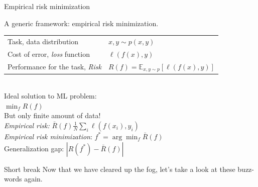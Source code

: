 \documentclass[10pt,a4paper,t,aspectratio=1610,dvipsnames]{beamer}
\begin{document}
\begin{frame}{Empirical risk minimization}
	\begin{center}
	A generic framework: empirical risk minimization.\\
	\vspace{2em}
	\begin{tabular}{ll}
		Task, data distribution & $x,y \sim p(x,y)$\\
		Cost of error, \emph{loss} function & $\ell(f(x),y)$\\
		Performance for the task, \emph{Risk} & $R(f) = \mathbb{E}_{x,y \sim p}[\ell(f(x),y)]$
	\end{tabular}\\
	\vspace{2em}
	Ideal solution to ML problem:\\
	$\min_f R(f)$\\
	\vspace{2em}
	But only finite amount of data!\\
	\emph{Empirical risk:} $\bar{R}(f)\frac{1}{N} \sum_i \ell(f(x_i),y_i)$\\
	\emph{Empirical risk minimization}: $f^* = \arg\min_f \bar{R}(f)$\\
	\vspace{2em}
	Generalization gap: $|R(f^*)-\bar{R}(f)|$
	\end{center}
\end{frame}

\begin{frame}{Short break}
	\vfill
	Now that we have cleared up the fog, let's take a look at these buzz-words again.
\end{frame}
\end{document}
